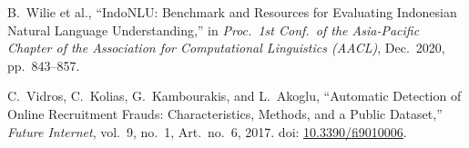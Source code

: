 \documentclass[12pt,a4paper]{article}
\begin{document}
\begin{enumerate}[label={[\arabic*]}, labelindent=0pt, leftmargin=0.95cm, labelwidth=0.60cm, labelsep=0.35cm, align=left, itemsep=3pt, parsep=0pt, topsep=2pt]
\item B.\ Wilie et al., ``IndoNLU: Benchmark and Resources for Evaluating Indonesian Natural
  Language Understanding,'' in \textit{Proc.\ 1st Conf.\ of the Asia-Pacific Chapter of the
  Association for Computational Linguistics (AACL)}, Dec.\ 2020, pp.\ 843--857.

\item C.\ Vidros, C.\ Kolias, G.\ Kambourakis, and L.\ Akoglu, ``Automatic Detection of Online
  Recruitment Frauds: Characteristics, Methods, and a Public Dataset,'' \textit{Future Internet},
  vol.\ 9, no.\ 1, Art.\ no.\ 6, 2017. doi: \href{https://doi.org/10.3390/fi9010006}{10.3390/fi9010006}.

\end{enumerate}
\endgroup
\end{document}
